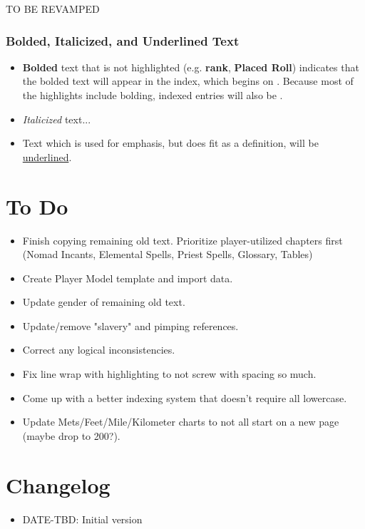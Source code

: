 TO BE REVAMPED


\subsubsection{Bolded, Italicized, and Underlined Text}
\begin{itemize}
\item \textbf{Bolded} text that is not highlighted (e.g. \textbf{rank}, \textbf{Placed Roll}) indicates that the bolded text will appear in the index, which begins on . Because most of the highlights include bolding, indexed entries will also be .
\item \textit{Italicized} text...
\item Text which is used for emphasis, but does fit as a definition, will be \ul{underlined}. 
\end{itemize}
\section{To Do}
\begin{itemize}
	\item Finish copying remaining old text. Prioritize player-utilized chapters first (Nomad Incants, Elemental Spells, Priest Spells, Glossary, Tables)
	\item Create Player Model template and import data.
	\item Update gender of remaining old text.
	\item Update/remove "slavery" and pimping references.
	\item Correct any logical inconsistencies.
	\item Fix line wrap with highlighting to not screw with spacing so much.
	\item Come up with a better indexing system that doesn't require all lowercase.
	\item Update Mets/Feet/Mile/Kilometer charts to not all start on a new page (maybe drop to 200?).
\end{itemize}
\section{Changelog}
\begin{itemize}[leftmargin=12pt]
\item DATE-TBD: Initial version
\end{itemize}